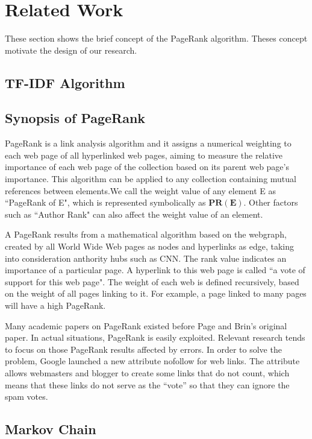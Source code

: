 \documentclass[lettersize,journal,12pt]{IEEEtran}
\begin{document}
\section{Related Work}

These section shows the brief concept of the PageRank algorithm. Theses concept motivate the design of our research.

\subsection{TF-IDF Algorithm}


\subsection{Synopsis of PageRank}

PageRank is a link analysis algorithm and it assigns a numerical weighting to each web page of all hyperlinked web pages, aiming to measure the relative importance of each web page of the collection based on its parent web page's importance. This algorithm can be applied to any collection containing mutual references between elements.We call the weight value of any element E as ``PageRank of E", which is represented symbolically as $\boldsymbol{PR(E)}$. Other factors such as ``Author Rank" can also affect the weight value of an element.

A PageRank results from a mathematical algorithm based on the webgraph, created by all World Wide Web pages as nodes and hyperlinks as edge, taking into consideration anthority hubs such as CNN. The rank value indicates an importance of a particular page. A hyperlink to this web page is called ``a vote of support for this web page". The weight of each web is defined recursively, based on the weight of all pages linking to it. For example, a page linked to many pages will have a high PageRank.

Many academic papers on PageRank existed before Page and Brin's original paper. In actual situations, PageRank is easily exploited. Relevant research tends to focus on those PageRank results affected by errors. In order to solve the problem, Google launched a new attribute nofollow for web links. The attribute allows webmasters and blogger to create some links that do not count, which means that these links do not serve as the ``vote'' so that they can ignore the spam votes.

\subsection{Markov Chain}
\end{document}

